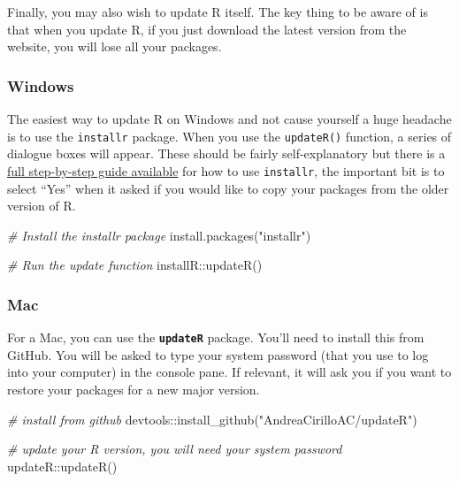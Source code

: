 \documentclass[
  oneside]{book}
\newenvironment{Shaded}{\begin{snugshade}}{\end{snugshade}}
\newcommand{\CommentTok}[1]{\textcolor[rgb]{0.56,0.35,0.01}{\textit{#1}}}
\newcommand{\FunctionTok}[1]{\textcolor[rgb]{0.00,0.00,0.00}{#1}}
\newcommand{\NormalTok}[1]{#1}
\newcommand{\SpecialCharTok}[1]{\textcolor[rgb]{0.00,0.00,0.00}{#1}}
\newcommand{\StringTok}[1]{\textcolor[rgb]{0.31,0.60,0.02}{#1}}
\begin{document}
Finally, you may also wish to update R itself. The key thing to be aware of is that when you update R, if you just download the latest version from the website, you will lose all your packages.

\hypertarget{windows}{%
\subsubsection{Windows}\label{windows}}

The easiest way to update R on Windows and not cause yourself a huge headache is to use the \texttt{installr} package. When you use the \texttt{updateR()} function, a series of dialogue boxes will appear. These should be fairly self-explanatory but there is a \href{https://www.r-statistics.com/2015/06/a-step-by-step-screenshots-tutorial-for-upgrading-r-on-windows/}{full step-by-step guide available} for how to use \texttt{installr}, the important bit is to select ``Yes'' when it asked if you would like to copy your packages from the older version of R.

\begin{Shaded}
\begin{Highlighting}[]
\CommentTok{\# Install the installr package}
\FunctionTok{install.packages}\NormalTok{(}\StringTok{"installr"}\NormalTok{)}

\CommentTok{\# Run the update function}
\NormalTok{installR}\SpecialCharTok{::}\FunctionTok{updateR}\NormalTok{()}
\end{Highlighting}
\end{Shaded}

\hypertarget{mac}{%
\subsubsection{Mac}\label{mac}}

For a Mac, you can use the \textbf{\texttt{updateR}} package. You'll need to install this from GitHub. You will be asked to type your system password (that you use to log into your computer) in the console pane. If relevant, it will ask you if you want to restore your packages for a new major version.

\begin{Shaded}
\begin{Highlighting}[]
\CommentTok{\# install from github}
\NormalTok{devtools}\SpecialCharTok{::}\FunctionTok{install\_github}\NormalTok{(}\StringTok{"AndreaCirilloAC/updateR"}\NormalTok{)}

\CommentTok{\# update your R version, you will need your system password}
\NormalTok{updateR}\SpecialCharTok{::}\FunctionTok{updateR}\NormalTok{()}
\end{Highlighting}
\end{Shaded}
\end{document}

